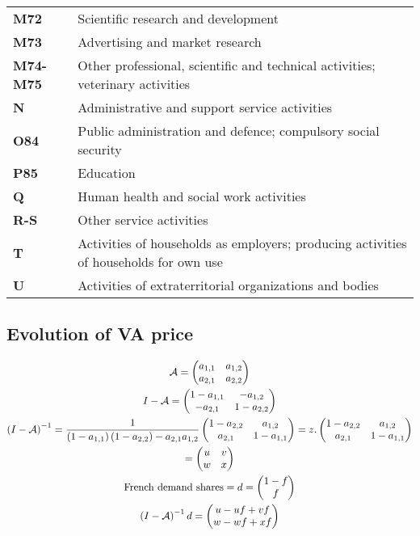 \documentclass[11pt,a4paper]{article}
\begin{document}
\begin{table}[!h]
\begin{tabular}{ll}
\textbf{M72} &{Scientific research and development}\\
\textbf{M73} &{Advertising and market research}\\
\textbf{M74-M75} &{Other professional, scientific and technical activities; veterinary activities}\\
\textbf{N} &{Administrative and support service activities}\\
\textbf{O84} &{Public administration and defence; compulsory social security}\\
\textbf{P85} &{Education}\\
\textbf{Q} &{Human health and social work activities}\\
\textbf{R-S} &{Other service activities}\\
\textbf{T} &{Activities of households as employers; producing activities of households for own use}\\
\textbf{U} &{Activities of extraterritorial organizations and bodies}\\
  	\end{tabular}
\label{tab:wiodindustries}
\end{table}


\subsection{Evolution of VA price}
\begin{gather*}
\cal {A} = \left(\begin{matrix}a_{1,1}&a_{1,2}\\a_{2,1}&a_{2,2}\end{matrix}\right)
\\
I-\cal {A}=\left(\begin{matrix}1-a_{1,1}&-a_{1,2}\\-a_{2,1}&1-a_{2,2}\end{matrix}\right)
\\
\left(I-\cal {A}\right)^{-1}=\frac{1}{\left(1-a_{1,1}\right)\left(1-a_{2,2}\right)-a_{2,1}a_{1,2}}\left(\begin{matrix}1-a_{2,2}&a_{1,2}\\a_{2,1}&1-a_{1,1}\end{matrix}\right) =z.\left(\begin{matrix}1-a_{2,2}&a_{1,2}\\a_{2,1}&1-a_{1,1}\end{matrix}\right) \\ 
=\left(\begin{matrix}u&v\\w&x\end{matrix}\right)
\\
\text{French demand shares}=d=\left(\begin{matrix}1-f\\f\end{matrix}\right) \\
\left(I-\cal {A}\right)^{-1}d=\left(\begin{matrix}u-uf+vf\\w-wf+xf\end{matrix}\right)
\end{gather*}
\end{document}
